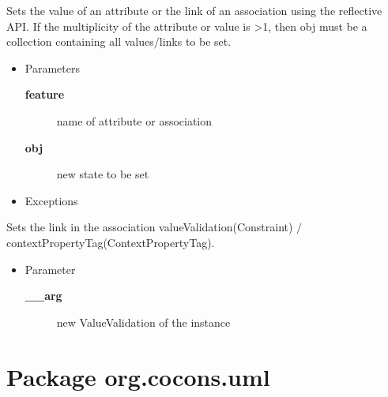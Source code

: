 \begin{desc}Sets the value of an attribute or the link of an association using the
 reflective API. If the multiplicity of the attribute or value is \textgreater  1,
 then obj must be a collection containing all values$/$links to be set.
\begin{itemize}
\item{Parameters
  \begin{description}
   \item[{\bf feature}]{name of attribute or association}
   \item[{\bf obj}]{new state to be set}
  \end{description}}
\end{itemize}
\begin{itemize}
\item{{Exceptions}
}
\end{itemize}
\end{desc}

\begin{desc}Sets the link in the association valueValidation(Constraint)
 $/$ contextPropertyTag(ContextPropertyTag).
\begin{itemize}
\item{Parameter
  \begin{description}
   \item[{\bf \_\_arg}]{new ValueValidation of the instance}
  \end{description}}
\end{itemize}
\end{desc}

\clearpage

\def\packagename{org.cocons.uml}

\section{Package org.cocons.uml}

